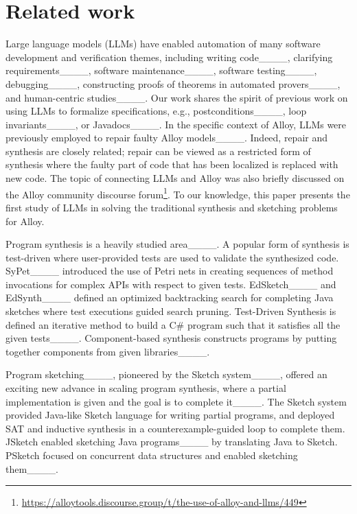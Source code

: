 \section{Related work}
\label{sec:related}

Large language models (LLMs) have enabled automation of many software
development and verification themes, including writing
code____, clarifying
requirements____, software
maintenance____,
software
testing____,
debugging____, constructing proofs
of theorems in automated provers____, and
human-centric studies____.  Our work
shares the spirit of previous work on using LLMs to formalize
specifications, e.g., postconditions____, loop
invariants____, or
Javadocs____.  In the specific context of Alloy,
LLMs were previously employed to repair faulty Alloy
models____.  Indeed, repair and synthesis
are closely related; repair can be viewed as a restricted form of
synthesis where the faulty part of code that has been localized is
replaced with new code.  The topic of connecting LLMs and Alloy was
also briefly discussed on the Alloy community discourse
forum\footnote{\url{https://alloytools.discourse.group/t/the-use-of-alloy-and-llms/449}}.
To our knowledge, this paper presents the first study of LLMs in
solving the traditional synthesis and sketching problems for Alloy.

Program synthesis is a heavily studied
area____.  A popular form of synthesis is
test-driven where user-provided tests are used to validate the
synthesized code.  SyPet____ introduced the use of
Petri nets in creating sequences of method invocations for complex
APIs with respect to given tests.  EdSketch____ and
EdSynth____ defined an optimized backtracking search
for completing Java sketches where test executions guided search
pruning.  Test-Driven Synthesis is defined an iterative method to build a
C$\#$ program such that it satisfies all the given tests____.
Component-based synthesis constructs programs by putting together
components from given libraries____.

Program
sketching____,
pioneered by the Sketch system____, offered an
exciting new advance in scaling program synthesis, where a partial
implementation is given and the goal is to complete
it____.
The Sketch system provided Java-like Sketch language for writing
partial programs, and deployed SAT and inductive synthesis in a
counterexample-guided loop to complete them.  JSketch enabled
sketching Java programs____ by translating Java to Sketch.
PSketch focused on concurrent data structures and enabled sketching
them____.

